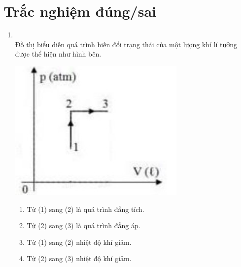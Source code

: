\section{Trắc nghiệm đúng/sai}
\begin{enumerate}[label=\bfseries Câu \arabic*:, leftmargin=1.7cm]
	\item{}\\
 Đồ thị biểu diễn quá trình biến đổi trạng thái của một lượng khí lí tưởng được thể hiện như hình bên.
 \begin{center}
 	\includegraphics[width=0.35\linewidth]{../figs/VN12-Y24-PH-SYL-014P-15}
 \end{center}
\begin{enumerate}[label=\alph*)]
	\item Từ (1) sang (2) là quá trình đẳng tích.
	\item Từ (2) sang (3) là quá trình đẳng áp.
	\item  Từ (1) sang (2) nhiệt độ khí giảm.
	\item Từ (2) sang (3) nhiệt độ khí giảm.
\end{enumerate}


\end{enumerate}
